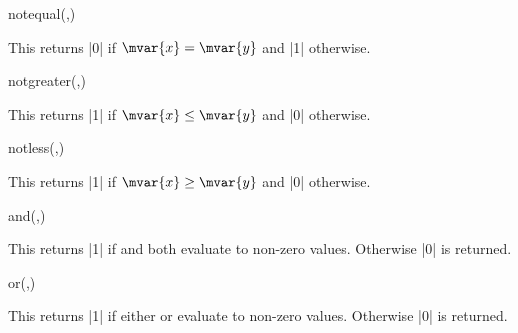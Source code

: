\begin{math-function}{notequal(,)}
\mathcommand

	This returns |0| if $\mvar{x}=\mvar{y}$ and |1| otherwise.
	
\begin{codeexample}[]
 \pgfmathresult
\end{codeexample}

\end{math-function}

\begin{math-function}{notgreater(,)}
\mathcommand

	This returns |1| if $\mvar{x}\leq\mvar{y}$ and |0| otherwise.
	
\begin{codeexample}[]
 \pgfmathresult
\end{codeexample}
\end{math-function}

\begin{math-function}{notless(,)}
\mathcommand

	This returns |1| if $\mvar{x}\geq\mvar{y}$ and |0| otherwise.
	
\begin{codeexample}[]
 \pgfmathresult
\end{codeexample}

\end{math-function}

\begin{math-function}{and(,)}
\mathcommand

	This returns |1| if  and  both evaluate to
	non-zero values. Otherwise |0| is returned.
	
\begin{codeexample}[]
 \pgfmathresult
\end{codeexample}

\end{math-function}

\begin{math-function}{or(,)}
\mathcommand

	This returns |1| if either  or  evaluate to
	non-zero values. Otherwise |0| is returned.
	
\begin{codeexample}[]
 \pgfmathresult
\end{codeexample}

\end{math-function}

